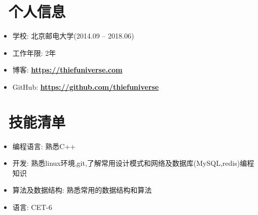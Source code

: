 \documentclass{resume}
\begin{document}

\basicInfo{
 \textbf{ \email {thiefuniverses@gmail.com}} \textperiodcentered\
  \phone{(+86) 130 5132 4828}
}


\section{\faGraduationCap\  个人信息}
\begin{itemize}[parsep=0.5ex]
  \item 学校: 北京邮电大学(2014.09 -- 2018.06)
  \item 工作年限: 2年
  \item 博客: \href{https://thiefuniverse.com} {\textbf{https://thiefuniverse.com}}
  \item GitHub: \href{https://github.com/thiefuniverse}{ \textbf{https://github.com/thiefuniverse}}
  \end{itemize}


\section{\faCogs\ 技能清单}
\begin{itemize}[parsep=0.5ex]
  \item 编程语言:  熟悉C++
  \item 开发: 熟悉linux环境,git,了解常用设计模式和网络及数据库(MySQL,redis)编程知识
  \item 算法及数据结构: 熟悉常用的数据结构和算法
  \item 语言: CET-6
\end{itemize}
\end{document}
